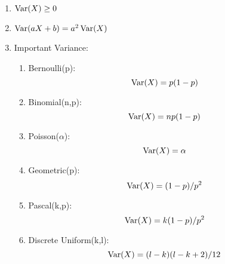 \begin{enumerate}
{\begin{enumerate}
{\begin{align*}
                    \sigma_x^2 
                    &= \Var(X) \\
                    &= \E{(X-\mu_x)^2} \\
                    &= \E{X^2-2\mu_xX+\mu_x^2} \\
                    &= \E{X^2}-2\mu_x\E{X}+\E{\mu_x^2} \\
                    &= \E{X^2}-2\mu_x^2+\mu_x^2 \\
                    &= \E{X^2}-\mu_x^2
                \end{align*}
            }
            \item $\mathop{\mathrm{Var}}\nolimits(X)\geq 0$
            \item $\mathop{\mathrm{Var}}\nolimits(aX+b)=a^2\mathop{\mathrm{Var}}\nolimits(X)$
            \item Important Variance:{
                \begin{enumerate}
                    \item Bernoulli(p): \[\mathop{\mathrm{Var}}\nolimits(X)=p(1-p)\]
                    \item Binomial(n,p): \[\mathop{\mathrm{Var}}\nolimits(X)=np(1-p)\]
                    \item Poisson($\alpha$): \[\mathop{\mathrm{Var}}\nolimits(X)=\alpha\]
                    \item Geometric(p): \[\mathop{\mathrm{Var}}\nolimits(X)=(1-p)/p^2\]
                    \item Pascal(k,p): \[\mathop{\mathrm{Var}}\nolimits(X)=k(1-p)/p^2\]
                    \item Discrete Uniform(k,l): \[\mathop{\mathrm{Var}}\nolimits(X)=(l-k)(l-k+2)/12\]
                \end{enumerate}
            }
        \end{enumerate}
    }
\end{enumerate}